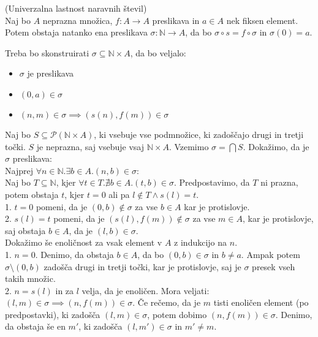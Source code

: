\begin{trditev}
    (Univerzalna lastnost naravnih števil) \\
    Naj bo $A$ neprazna množica, $f: A \to A$ preslikava in $a \in A$ nek fiksen element.
    Potem obstaja natanko ena preslikava $\sigma: \mathbb{N} \to A$, da bo $\sigma \circ s = f \circ \sigma$ in $\sigma(0) = a$.
\end{trditev}
\begin{dokaz}
    Treba bo skonstruirati $\sigma \subseteq \mathbb{N} \times A$, da bo veljalo:
    \begin{itemize}
        \item $\sigma$ je preslikava
        \item $(0, a) \in \sigma$
        \item $(n, m) \in \sigma \implies (s(n), f(m)) \in \sigma$
    \end{itemize}
    Naj bo $S \subseteq \mathcal{P}(\mathbb{N} \times A)$, ki vsebuje vse podmnožice, ki zadoščajo drugi in tretji točki.
    $S$ je neprazna, saj vsebuje vsaj $\mathbb{N} \times A$.
    Vzemimo $\sigma = \bigcap S$.
    Dokažimo, da je $\sigma$ preslikava: \\
    Najprej $\forall n \in \mathbb{N}. \exists b \in A. (n, b) \in \sigma$: \\
    Naj bo $T \subseteq \mathbb{N}$, kjer $\forall t \in T. \nexists b \in A. (t, b) \in \sigma$.
    Predpostavimo, da $T$ ni prazna, potem obstaja $t$, kjer $t = 0$ ali pa $l \notin T \wedge s(l) = t$. \\
    1. $t = 0$ pomeni, da je $(0, b) \notin \sigma$ za vse $b \in A$ kar je protislovje. \\
    2. $s(l) = t$ pomeni, da je $(s(l), f(m)) \notin \sigma$ za vse $m \in A$, kar je protislovje, saj obstaja $b \in A$, da je $(l, b) \in \sigma$. \\
    Dokažimo še enoličnost za vsak element v $A$ z indukcijo na $n$. \\
    1. $n = 0$.
    Denimo, da obstaja $b \in A$, da bo $(0, b) \in \sigma$ in $b \neq a$.
    Ampak potem $\sigma \setminus {(0, b)}$ zadošča drugi in tretji točki, kar je protislovje, saj je $\sigma$ presek vseh takih množic. \\
    2. $n = s(l)$ in za $l$ velja, da je enoličen.
    Mora veljati: $(l, m) \in \sigma \implies (n, f(m)) \in \sigma$.
    Če rečemo, da je $m$ tisti enoličen element (po predpostavki), ki zadošča $(l, m) \in \sigma$, potem dobimo $(n, f(m)) \in \sigma$.
    Denimo, da obstaja še en $m'$, ki zadošča $(l, m') \in \sigma$ in $m' \neq m$.

\end{dokaz}
